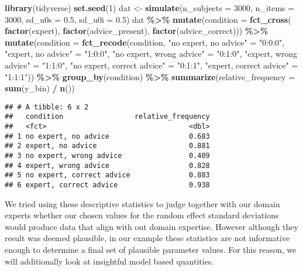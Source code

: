 \documentclass[
  man,floatsintext]{apa6}
\newenvironment{Shaded}{\begin{snugshade}}{\end{snugshade}}
\newcommand{\AttributeTok}[1]{\textcolor[rgb]{0.13,0.29,0.53}{#1}}
\newcommand{\DecValTok}[1]{\textcolor[rgb]{0.00,0.00,0.81}{#1}}
\newcommand{\FloatTok}[1]{\textcolor[rgb]{0.00,0.00,0.81}{#1}}
\newcommand{\FunctionTok}[1]{\textcolor[rgb]{0.13,0.29,0.53}{\textbf{#1}}}
\newcommand{\NormalTok}[1]{#1}
\newcommand{\OtherTok}[1]{\textcolor[rgb]{0.56,0.35,0.01}{#1}}
\newcommand{\SpecialCharTok}[1]{\textcolor[rgb]{0.81,0.36,0.00}{\textbf{#1}}}
\newcommand{\StringTok}[1]{\textcolor[rgb]{0.31,0.60,0.02}{#1}}
\begin{document}
\begin{Shaded}
\begin{Highlighting}[]
\FunctionTok{library}\NormalTok{(tidyverse)}
\FunctionTok{set.seed}\NormalTok{(}\DecValTok{1}\NormalTok{)}
\NormalTok{dat }\OtherTok{\textless{}{-}} \FunctionTok{simulate}\NormalTok{(}\AttributeTok{n\_subjects =} \DecValTok{3000}\NormalTok{, }\AttributeTok{n\_items =} \DecValTok{3000}\NormalTok{,}
  \AttributeTok{sd\_u0s =} \FloatTok{0.5}\NormalTok{, }\AttributeTok{sd\_u0i =} \FloatTok{0.5}\NormalTok{)}
\NormalTok{dat }\SpecialCharTok{\%\textgreater{}\%} 
  \FunctionTok{mutate}\NormalTok{(}\AttributeTok{condition =} \FunctionTok{fct\_cross}\NormalTok{(}
    \FunctionTok{factor}\NormalTok{(expert), }\FunctionTok{factor}\NormalTok{(advice\_present), }\FunctionTok{factor}\NormalTok{(advice\_correct))) }\SpecialCharTok{\%\textgreater{}\%}
  \FunctionTok{mutate}\NormalTok{(}\AttributeTok{condition =} \FunctionTok{fct\_recode}\NormalTok{(condition,}
    \StringTok{"no expert, no advice"} \OtherTok{=} \StringTok{"0:0:0"}\NormalTok{, }\StringTok{"expert, no advice"} \OtherTok{=} \StringTok{"1:0:0"}\NormalTok{, }
    \StringTok{"no expert, wrong advice"} \OtherTok{=} \StringTok{"0:1:0"}\NormalTok{, }\StringTok{"expert, wrong advice"} \OtherTok{=} \StringTok{"1:1:0"}\NormalTok{,}
    \StringTok{"no expert, correct advice"} \OtherTok{=} \StringTok{"0:1:1"}\NormalTok{, }\StringTok{"expert, correct advice"} \OtherTok{=} \StringTok{"1:1:1"}\NormalTok{)) }\SpecialCharTok{\%\textgreater{}\%} 
  \FunctionTok{group\_by}\NormalTok{(condition) }\SpecialCharTok{\%\textgreater{}\%}
  \FunctionTok{summarize}\NormalTok{(}\AttributeTok{relative\_frequency =} \FunctionTok{sum}\NormalTok{(y\_bin) }\SpecialCharTok{/} \FunctionTok{n}\NormalTok{())}
\end{Highlighting}
\end{Shaded}

\begin{verbatim}
## # A tibble: 6 x 2
##   condition                 relative_frequency
##   <fct>                                  <dbl>
## 1 no expert, no advice                   0.683
## 2 expert, no advice                      0.881
## 3 no expert, wrong advice                0.409
## 4 expert, wrong advice                   0.828
## 5 no expert, correct advice              0.883
## 6 expert, correct advice                 0.938
\end{verbatim}

We tried using these descriptive statistics to judge together with our domain experts whether our chosen values for the random effect standard deviations would produce data that align with out domain expertise.
However although they result was deemed plausible, in our example these statistics are not informative enough to determine a final set of plausible parameter values.
For this reason, we will additionally look at insightful model based quantities.
\end{document}
